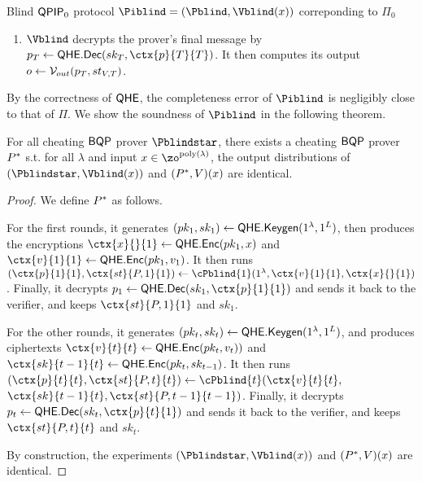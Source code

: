 \begin{protocol}{Blind $\operatorname{\mathsf{QPIP}}_0$ protocol $\Piblind=(\Pblind, \Vblind(x))$ correponding to $\Pi_0$}
\begin{enumerate}
\begin{enumerate}
				then homomorphically decrypts the old encryption by
				$\ctx{st}{P, t-1}{t}\leftarrow\QEval(pk_t, \QDec,$ \ $\ctx{sk}{t-1}{t}, \ctx{st}{P, t-1}{t-1, t})$.
				Then it applies the next-message function homomorphically, generating
				$(\ctx{p}{t}{t}, \ctx{st}{P, t}{t})\leftarrow\QEval(pk_t, \cP_t, \ctx{v}{t}{t}, \ctx{st}{P, t-1}{t})$.
				It sends $\ctx{p}{t}{t}$ back to the verifier.
		\end{enumerate}
		\item $\Vblind$ decrypts the prover's final message by $p_T\leftarrow\QDec(sk_T, \ctx{p}{T}{T})$.
			It then computes its output $o\leftarrow\mathcal{V}_{out}(p_T, st_{V, T})$.
	\end{enumerate}
\end{protocol}

By the correctness of $\mathsf{QHE}$, the completeness error of $\Piblind$ is negligibly close to that of $\Pi$.
We show the soundness of $\Piblind$ in the following theorem.

\begin{theorem}
	For all cheating $\operatorname{\mathsf{BQP}}$ prover $\Pblindstar$, there exists a cheating $\operatorname{\mathsf{BQP}}$ prover $P^*$ s.t. for all $\lambda$ and input $x\in\zo^{\poly(\lambda)}$, the output distributions of $(\Pblindstar, \Vblind(x))$ and $(P^*, V)(x)$ are identical.
\end{theorem}
\begin{proof}
	We define $P^*$ as follows.
	
	For the first rounds, it generates
	$(pk_1, sk_1)\leftarrow\mathsf{QHE.Keygen}(1^\lambda, 1^L)$, then produces the encryptions
	$\ctx{x}{}{1}\leftarrow\QEnc(pk_1, x)$ and $\ctx{v}{1}{1}\leftarrow\QEnc(pk_1, v_1)$.
	It then runs $(\ctx{p}{1}{1}, \ctx{st}{P, 1}{1})\leftarrow\cPblind{1}(1^\lambda, \ctx{v}{1}{1}, \ctx{x}{}{1})$.
	Finally, it decrypts $p_1\leftarrow\QDec(sk_1, \ctx{p}{1}{1})$ and sends it back to the verifier,
	and keeps $\ctx{st}{P, 1}{1}$ and $sk_1$.

	For the other rounds, it generates
	$(pk_t, sk_t)\leftarrow\mathsf{QHE.Keygen}(1^\lambda, 1^L)$, and produces ciphertexts
	$\ctx{v}{t}{t}\leftarrow\QEnc(pk_t, v_t))$ and $\ctx{sk}{t-1}{t}\leftarrow\QEnc(pk_t, sk_{t-1})$.
	It then runs $(\ctx{p}{t}{t}, \ctx{st}{P, t}{t})\leftarrow\cPblind{t}(\ctx{v}{t}{t},$ \ $\ctx{sk}{t-1}{t}, \ctx{st}{P, t-1}{t-1})$.
	Finally, it decrypts $p_t\leftarrow\QDec(sk_t, \ctx{p}{t}{1})$ and sends it back to the verifier,
	and keeps $\ctx{st}{P, t}{t}$ and $sk_t$.
		
	By construction, the experiments $(\Pblindstar, \Vblind(x))$ and $(P^*, V)(x)$ are identical.
\end{proof}

